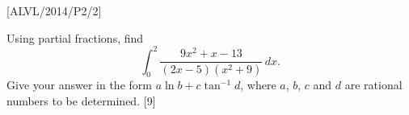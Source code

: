 \item {[}ALVL/2014/P2/2{]}

Using partial fractions, find 
\[
\int_{0}^{2}\frac{9x^{2}+x-13}{\left(2x-5\right)\left(x^{2}+9\right)}\,dx.
\]
Give your answer in the form $a\ln b+c\tan^{-1}d$, where $a$, $b$,
$c$ and $d$ are rational numbers to be determined.\hfill{} {[}9{]}
